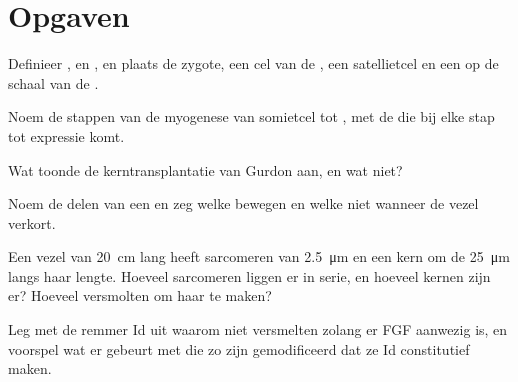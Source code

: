 \section{Opgaven}

\begin{exercise}[$\star$]\label{exo:b2:cell-differentiation:1}
Definieer ,  en , en plaats de zygote,
een cel van de , een satellietcel en een  op
de schaal van de .
\end{exercise}

\begin{exercise}[$\star$]\label{exo:b2:cell-differentiation:2}
Noem de stappen van de myogenese van somietcel tot , met de
 die bij elke stap tot expressie komt.
\end{exercise}

\begin{exercise}[$\star$]\label{exo:b2:cell-differentiation:3}
Wat toonde de kerntransplantatie van Gurdon aan, en wat niet?
\end{exercise}

\begin{exercise}[$\star$]\label{exo:b2:cell-differentiation:4}
Noem de delen van een  en zeg welke bewegen en welke niet wanneer
de vezel verkort.
\end{exercise}

\begin{exercise}[$\star\star$]\label{exo:b2:cell-differentiation:5}
Een vezel van \qty{20}{cm} lang heeft sarcomeren van \qty{2.5}{\micro m} en
een kern om de \qty{25}{\micro m} langs haar lengte. Hoeveel sarcomeren
liggen er in serie, en hoeveel kernen zijn er? Hoeveel 
versmolten om haar te maken?
\end{exercise}

\begin{exercise}[$\star\star$]\label{exo:b2:cell-differentiation:6}
Leg met de remmer Id uit waarom  niet versmelten zolang er FGF
aanwezig is, en voorspel wat er gebeurt met  die zo zijn
gemodificeerd dat ze Id constitutief maken.
\end{exercise}

